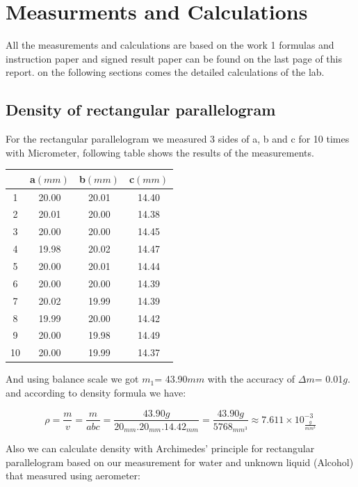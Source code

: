 \documentclass[a4paper, 12pt]{article}
\begin{document}
\section{Measurments and Calculations}

All the measurements and calculations are based on the work 1 formulas and instruction paper and signed result paper can be found on the last page of this report. on the following sections comes the detailed calculations of the lab.

\subsection{Density of rectangular parallelogram}

For the rectangular parallelogram we measured 3 sides of a, b and c for 10 times with Micrometer, following table shows the results of the measurements.

\begin{center}
	\begin{tabular}{||c c c c||} 
		\hline
		   &  a\((mm)\) & b\((mm)\)  &  c\((mm)\)  \\ [0.5ex] 
		\hline\hline
		1 & 20.00 & 20.01 & 14.40 \\ 
		\hline
		2 & 20.01 & 20.00 & 14.38 \\
		\hline
		3 & 20.00 & 20.00 & 14.45 \\
		\hline
		4 & 19.98 & 20.02 & 14.47 \\
		\hline
		5 & 20.00 & 20.01 & 14.44 \\
		\hline
		6 & 20.00 & 20.00 & 14.39 \\
		\hline
		7 & 20.02 & 19.99 & 14.39 \\
		\hline
		8 & 19.99 & 20.00 & 14.42 \\
		\hline
		9 & 20.00 & 19.98 & 14.49 \\
		\hline
		10 & 20.00 & 19.99 &  14.37 \\ [1ex] 
		\hline
	\end{tabular}
\end{center}

And using balance scale we got \(m_{1}\)= 43.90\(mm\) with the accuracy of \(\varDelta m\)= 0.01\(g\). and according to density formula we have:

\[
\rho = \frac{m}{v} = \frac{m}{abc} = \frac{43.90g}{20_{mm}.20_{mm}.14.42_{mm}} = \frac{43.90g}{5768_{mm^{3}}} \approx 7.611\times10^{-3}_{\frac{g}{mm^{3}}}
\]

Also we can calculate density with Archimedes’ principle for rectangular parallelogram based on our measurement for water and unknown liquid (Alcohol) that measured using aerometer:
\end{document}

